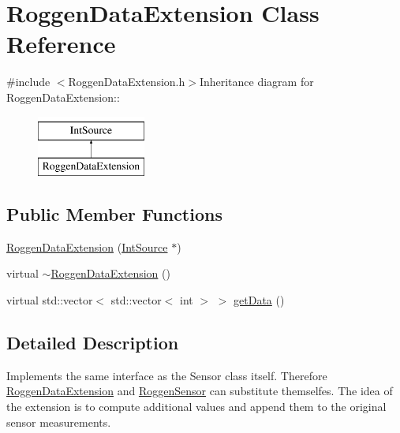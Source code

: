 \hypertarget{classRoggenDataExtension}{
\section{RoggenDataExtension Class Reference}
\label{classRoggenDataExtension}
}


{\ttfamily \#include $<$RoggenDataExtension.h$>$}Inheritance diagram for RoggenDataExtension::\begin{figure}[H]
\begin{center}
\leavevmode
\includegraphics[height=2cm]{classRoggenDataExtension}
\end{center}
\end{figure}
\subsection*{Public Member Functions}
\begin{DoxyCompactItemize}
\item 
\hyperlink{classRoggenDataExtension_a5521528f2ce09331562a55c25db1f3cd}{RoggenDataExtension} (\hyperlink{classIntSource}{IntSource} $\ast$)
\item 
virtual \hyperlink{classRoggenDataExtension_abe05c1ed873ba4af82a1a34d1ba49607}{$\sim$RoggenDataExtension} ()
\item 
virtual std::vector$<$ std::vector$<$ int $>$ $>$ \hyperlink{classRoggenDataExtension_a94526906d1299c091c646fe781aac0fd}{getData} ()
\end{DoxyCompactItemize}


\subsection{Detailed Description}
Implements the same interface as the Sensor class itself. Therefore \hyperlink{classRoggenDataExtension}{RoggenDataExtension} and \hyperlink{classRoggenSensor}{RoggenSensor} can substitute themselfes. The idea of the extension is to compute additional values and append them to the original sensor measurements. 

